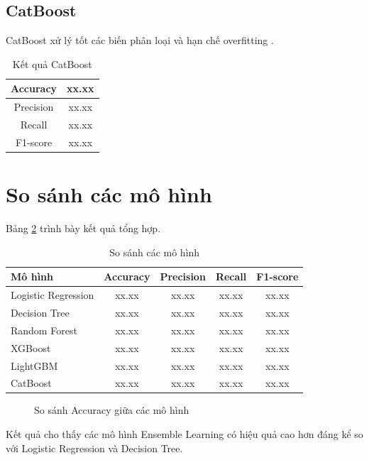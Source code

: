 \subsection{CatBoost}

CatBoost xử lý tốt các biến phân loại và hạn chế overfitting \cite{prokhorenkova2018catboost}.

\begin{table}[H]
\centering
\caption{Kết quả CatBoost}
\label{tab:cat_result}
\begin{tabular}{|c|c|}
\hline
Accuracy & xx.xx \\
\hline
Precision & xx.xx \\
\hline
Recall & xx.xx \\
\hline
F1-score & xx.xx \\
\hline
\end{tabular}
\end{table}

\section{So sánh các mô hình}

Bảng \ref{tab:model_compare} trình bày kết quả tổng hợp.

\begin{table}[H]
\centering
\caption{So sánh các mô hình}
\label{tab:model_compare}
\begin{tabular}{|l|c|c|c|c|}
\hline
Mô hình & Accuracy & Precision & Recall & F1-score \\
\hline
Logistic Regression & xx.xx & xx.xx & xx.xx & xx.xx \\
Decision Tree & xx.xx & xx.xx & xx.xx & xx.xx \\
Random Forest & xx.xx & xx.xx & xx.xx & xx.xx \\
XGBoost & xx.xx & xx.xx & xx.xx & xx.xx \\
LightGBM & xx.xx & xx.xx & xx.xx & xx.xx \\
CatBoost & xx.xx & xx.xx & xx.xx & xx.xx \\
\hline
\end{tabular}
\end{table}

\begin{figure}[H]
\centering
\caption{So sánh Accuracy giữa các mô hình}
\end{figure}

Kết quả cho thấy các mô hình Ensemble Learning có hiệu quả cao hơn đáng kể so với Logistic Regression và Decision Tree.

